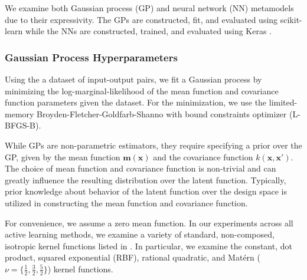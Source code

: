\documentclass[conference]{IEEEtran}
\begin{document}
	We examine both Gaussian process (GP) and neural network (NN) metamodels due to their expressivity. The GPs are constructed, fit, and evaluated using scikit-learn \cite{Scikit-learn:Python} while the NNs are constructed, trained, and evaluated using Keras \cite{Keras:API}.
	
	\subsubsection{Gaussian Process Hyperparameters}
	
	Using the a dataset of input-output pairs, we fit a Gaussian process by minimizing the log-marginal-likelihood of the mean function and covariance function parameters given the dataset. For the minimization, we use the limited-memory Broyden-Fletcher-Goldfarb-Shanno with bound constraints optimizer (\textsc{L-BFGS-B}).
	
	While GPs are non-parametric estimators, they require specifying a prior over the GP, given by the mean function $\boldsymbol{m}(\boldsymbol{x})$ and the covariance function $k(\boldsymbol{x}, \boldsymbol{x}')$. The choice of mean function and covariance function is non-trivial and can greatly influence the resulting distribution over the latent function. Typically, prior knowledge about behavior of the latent function over the design space is utilized in constructing the mean function and covariance function.
	
	For convenience, we assume a zero mean function. In our experiments across all active learning methods, we examine a variety of standard, non-composed, isotropic kernel functions listed in . In particular, we examine the constant, dot product, squared exponential (RBF), rational quadratic, and Mat\'ern ($\nu = \{\tfrac{1}{2}, \tfrac{3}{2}, \tfrac{5}{2}\}$) kernel functions. 
	
\end{document}
